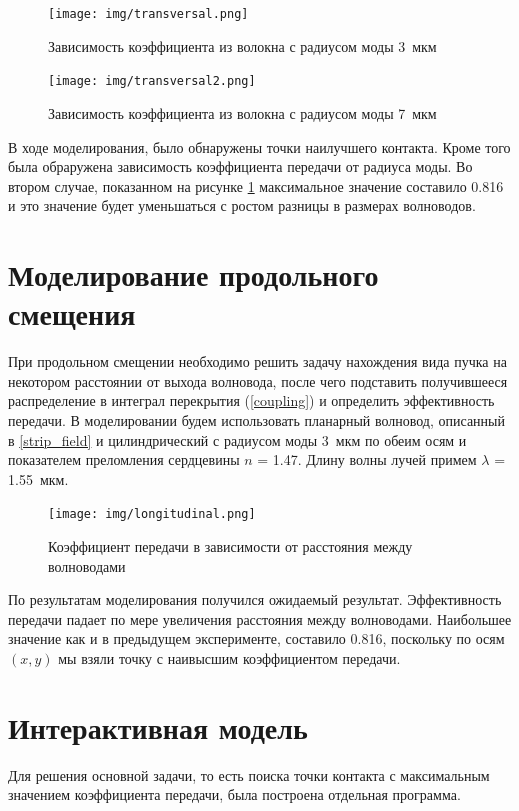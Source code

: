 \begin{figure}[h!]
		\texttt{[image: img/transversal.png]}
		\caption{Зависимость коэффициента из волокна с радиусом моды 3~мкм}
\end{figure}
\begin{figure}[h!]
		\texttt{[image: img/transversal2.png]}
		\caption{Зависимость коэффициента из волокна с радиусом моды 7~мкм}
		\label{twoCylinders2}
\end{figure}

В ходе моделирования, было обнаружены точки наилучшего контакта. Кроме того была обраружена зависимость коэффициента передачи от радиуса моды. Во втором случае, показанном на рисунке \ref{twoCylinders2} максимальное значение составило 0.816 и это значение будет уменьшаться с ростом разницы в размерах волноводов.

\section{Моделирование продольного смещения}

При продольном смещении необходимо решить задачу нахождения вида пучка на некотором расстоянии от выхода волновода, после чего подставить получившееся распределение в интеграл перекрытия (\ref{coupling}) и определить эффективность передачи.
В моделировании будем использовать планарный волновод, описанный в \ref{strip_field} и цилиндрический с радиусом моды 3~мкм по обеим осям и показателем преломления сердцевины $n$ = 1.47. Длину волны лучей примем $\lambda$ = 1.55~мкм.

\begin{figure}[h!]
	\texttt{[image: img/longitudinal.png]}
	\caption{Коэффициент передачи в зависимости от расстояния между волноводами}
	\label{longitudinal}
\end{figure}

По результатам моделирования получился ожидаемый результат. Эффективность передачи падает по мере увеличения расстояния между волноводами. Наибольшее значение как и в предыдущем эксперименте, составило 0.816, поскольку по осям $(x,y)$ мы взяли точку с наивысшим коэффициентом передачи.   

\section{Интерактивная модель}
Для решения основной задачи, то есть поиска точки контакта с максимальным значением коэффициента передачи, была построена отдельная программа.

